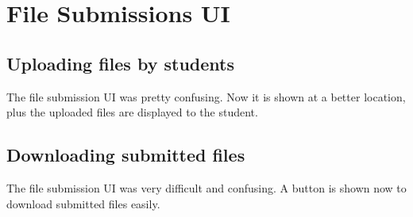 \section{File Submissions UI}

\subsection{Uploading files by students}
The file submission UI was pretty confusing. Now it is shown at a better location, plus the uploaded files are displayed to the student.

\subsection{Downloading submitted files}
The file submission UI was very difficult and confusing. A button is shown now to download submitted files easily.

